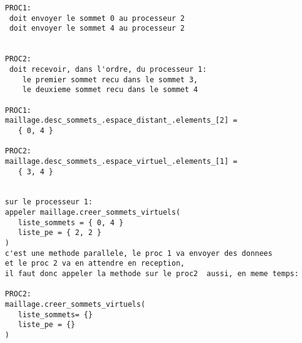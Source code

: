 \begin{verbatim}
PROC1:                                   
 doit envoyer le sommet 0 au processeur 2
 doit envoyer le sommet 4 au processeur 2


PROC2:
 doit recevoir, dans l'ordre, du processeur 1:
    le premier sommet recu dans le sommet 3,  
    le deuxieme sommet recu dans le sommet 4  

PROC1:
maillage.desc_sommets_.espace_distant_.elements_[2] =
   { 0, 4 }                                          

PROC2:
maillage.desc_sommets_.espace_virtuel_.elements_[1] =
   { 3, 4 }


sur le processeur 1:
appeler maillage.creer_sommets_virtuels(
   liste_sommets = { 0, 4 }
   liste_pe = { 2, 2 }
)
c'est une methode parallele, le proc 1 va envoyer des donnees
et le proc 2 va en attendre en reception,
il faut donc appeler la methode sur le proc2  aussi, en meme temps:

PROC2:
maillage.creer_sommets_virtuels(
   liste_sommets= {}
   liste_pe = {}
)
\end{verbatim}